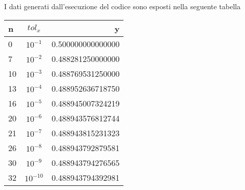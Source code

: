 

I dati generati dall'esecuzione del codice sono esposti  nella seguente tabella

\begin{tabular}{l c r}

n & $tol_x$ & y \\
\hline
0 & $10^{-1}$ & 0.500000000000000 \\
7 & $10^{-2}$ & 0.488281250000000 \\
10 & $10^{-3}$ &  0.488769531250000 \\
13 & $10^{-4}$ & 0.488952636718750 \\
16 & $10^{-5}$ & 0.488945007324219 \\
20 & $10^{-6}$ & 0.488943576812744 \\
21 & $10^{-7}$ & 0.488943815231323 \\
26 & $10^{-8}$ & 0.488943792879581 \\
30 & $10^{-9}$ & 0.488943794276565 \\
32 & $10^{-10}$ & 0.488943794392981 \\
\hline
\end{tabular}

